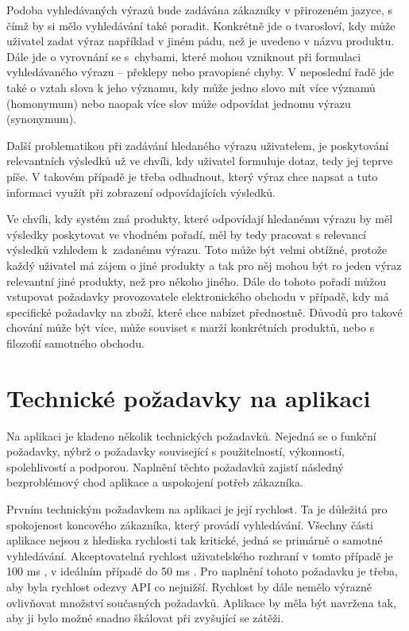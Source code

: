 \documentclass[FM,DP]{tulthesis}
\begin{document}
Podoba vyhledávaných výrazů bude zadávána zákazníky v přirozeném jazyce, s čímž by si mělo
vyhledávání také poradit. Konkrétně jde o tvarosloví, kdy může uživatel zadat výraz
například v jiném pádu, než je uvedeno v názvu produktu. Dále jde o vyrovnání se
s~chybami, které mohou vzniknout při formulaci vyhledávaného výrazu -- překlepy nebo
pravopisné chyby. V neposlední řadě jde také o vztah slova k jeho významu, kdy může
jedno slovo mít více významů (homonymum) nebo naopak více slov může odpovídat jednomu výrazu
(synonymum).

Další problematikou při zadávání hledaného výrazu uživatelem, je poskytování relevantních výsledků
už ve chvíli, kdy uživatel formuluje dotaz, tedy jej teprve píše. V takovém případě je třeba
odhadnout, který výraz chce napsat a tuto informaci využít při zobrazení odpovídajících
výsledků.

Ve chvíli, kdy systém zná produkty, které odpovídají hledanému výrazu by měl
výsledky poskytovat ve vhodném pořadí, měl by tedy pracovat s relevancí výsledků vzhledem 
k~zadanému výrazu. Toto může být velmi obtížné, protože každý uživatel má zájem o jiné
produkty a tak pro něj mohou být ro jeden výraz relevantní jiné produkty, než pro někoho
jiného. Dále do tohoto pořadí můžou vstupovat požadavky provozovatele elektronického obchodu
v případě, kdy má specifické požadavky na zboží, které chce nabízet přednostně. Důvodů
pro takové chování může být více, může souviset s marží konkrétních produktů, 
nebo s filozofií samotného obchodu.

\section{Technické požadavky na aplikaci}

Na aplikaci je kladeno několik technických požadavků. Nejedná se o funkční požadavky, nýbrž
o požadavky související s použitelností, výkonností, spolehlivostí a podporou. Naplnění těchto
požadavků zajistí následný bezproblémový chod aplikace a uspokojení potřeb zákazníka.

Prvním technickým požadavkem na aplikaci je její rychlost. Ta je důležitá pro spokojenost
koncového zákazníka, který provádí vyhledávání. Všechny části aplikace nejsou z hlediska rychlosti
tak kritické, jedná se primárně o samotné vyhledávání. Akceptovatelná rychlost uživatelského rozhraní 
v tomto případě je 100 ms \cite{amazon-100ms}, v ideálním případě do 50 ms \cite{stackshare-algolia}. 
Pro naplnění tohoto požadavku je třeba, aby byla rychlost odezvy API co nejnižší.
Rychlost by dále nemělo výrazně ovlivňovat množství současných požadavků. 
Aplikace by měla být navržena tak, aby ji bylo možné snadno škálovat při zvyšující se zátěži.
\end{document}
